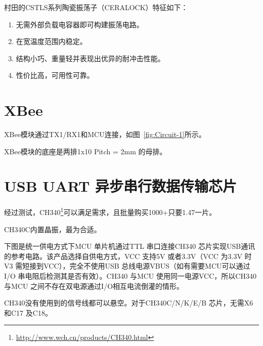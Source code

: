 村田的CSTLS系列陶瓷振荡子（CERALOCK）特征如下：

\begin{enumerate}
    \item 无需外部负载电容器即可构建振荡电路。
    \item 在宽温度范围内稳定。
    \item 结构小巧、重量轻并表现出优异的耐冲击性能。
    \item 性价比高，可用性可靠。
\end{enumerate}

\section{XBee}

XBee模块通过TX1/RX1和MCU连接，如图~\ref{fig:Circuit-1}所示。

XBee模块的底座是两排1x10 Pitch = 2mm 的母排。

\section{USB UART 异步串行数据传输芯片}




经过测试，CH340\footnote{\url{http://www.wch.cn/products/CH340.html}}可以满足需求，且批量购买1000+只要1.47一片。

CH340C内置晶振，最为合适。

下图是统一供电方式下MCU 单片机通过TTL 串口连接CH340 芯片实现USB通讯的参考电路。该产品选择自供电方式，VCC 支持5V 或者3.3V（VCC 为3.3V 时V3 需短接到VCC），完全不使用USB 总线电源VBUS（如有需要MCU可以通过I/O 串电阻后检测其是否有效）。CH340 与MCU 使用同一电源VCC，所以CH340与MCU 之间不存在双电源通过I/O相互电流倒灌的情形。

CH340没有使用到的信号线都可以悬空。对于CH340C/N/K/E/B 芯片，无需X6 和C17 及C18。

